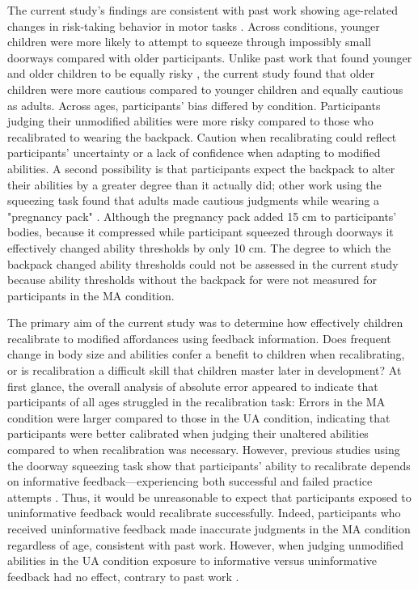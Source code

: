 \documentclass[a4paper,man,natbib,floatsintext,noextraspace]{apa6}
\begin{document}
The current study's findings are consistent with past work showing age-related changes in risk-taking behavior in motor tasks \citep{Plumert95,DekkerNardini,Plumert97}. Across conditions, younger children were more likely to attempt to squeeze through impossibly small doorways compared with older participants. Unlike past work that found younger and older children to be equally risky \citep{DekkerNardini}, the current study found that older children were more cautious compared to younger children and equally cautious as adults. Across ages, participants' bias differed by condition. Participants judging their unmodified abilities were more risky compared to those who recalibrated to wearing the backpack. Caution when recalibrating could reflect participants' uncertainty or a lack of confidence when adapting to modified abilities. A second possibility is that participants expect the backpack to alter their abilities by a greater degree than it actually did; other work using the squeezing task found that adults made cautious judgments while wearing a "pregnancy pack" \citep{PregAps}. Although the pregnancy pack added 15 cm to participants' bodies, because it compressed while participant squeezed through doorways it effectively changed ability thresholds by only 10 cm. The degree to which the backpack changed ability thresholds could not be assessed in the current study because ability thresholds without the backpack for were not measured for participants in the MA condition.

The primary aim of the current study was to determine how effectively children recalibrate to modified affordances using feedback information. Does frequent change in body size and abilities confer a benefit to children when recalibrating, or is recalibration a difficult skill that children master later in development? At first glance, the overall analysis of absolute error appeared to indicate that participants of all ages struggled in the recalibration task: Errors in the MA condition were larger compared to those in the UA condition, indicating that participants were better calibrated when judging their unaltered abilities compared to when recalibration was necessary. However, previous studies using the doorway squeezing task show that participants' ability to recalibrate depends on informative feedback---experiencing both successful and failed practice attempts \citep{DoorwayExplore, Recal}. Thus, it would be unreasonable to expect that participants exposed to uninformative feedback would recalibrate successfully. Indeed, participants who received uninformative feedback made inaccurate judgments in the MA condition regardless of age, consistent with past work. However, when judging unmodified abilities in the UA condition exposure to informative versus uninformative feedback had no effect, contrary to past work \citep{Dina} .
\end{document}
